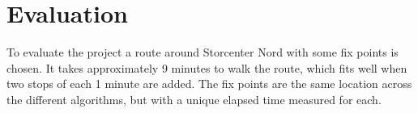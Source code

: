 \section{Evaluation}
To evaluate the project a route around Storcenter Nord with some fix points is chosen. It takes approximately 9 minutes to walk the route, which fits well when two stops of each 1 minute are added. The fix points are the same location across the different algorithms, but with a unique elapsed time measured for each.





